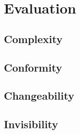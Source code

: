 \section{Evaluation}\label{evaluation}

\subsection{Complexity}\label{comparison}

\subsection{Conformity}\label{comparison}

\subsection{Changeability}\label{comparison}

\subsection{Invisibility}\label{comparison}
